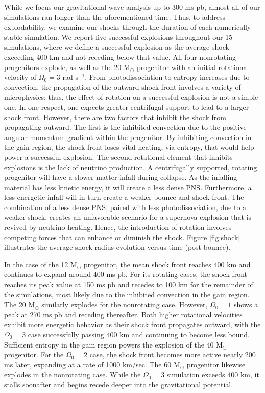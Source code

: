 \documentclass[twocolumn,times]{aastex62}  %
\newcommand{\Msun}{\ensuremath{\mathrm{M}_\odot}\xspace}
\begin{document}
While we focus our gravitational wave analysis up to 300 ms pb, almost all of our simulations ran longer than the aforementioned time.  Thus, to address explodability, we examine our shocks through the duration of each numerically stable simulation.  We report five successful explosions throughout our 15 simulations, where we define a successful explosion as the average shock exceeding 400 km and not receding below that value.  All four nonrotating progenitors explode, as well as the 20 \Msun progenitor with an initial rotational velocity of $\Omega_0 = 3$ rad s$^{-1}$.  From photodissociation to entropy increases due to convection, the propagation of the outward shock front involves a variety of microphysics; thus, the effect of rotation on a successful explosion is not a simple one.  In one respect, one expects greater centrifugal support to lead to a larger shock front.  However, there are two factors that inhibit the shock from propagating outward.  The first is the inhibited convection due to the positive angular momentum gradient within the progenitor.  By inhibiting convection in the gain region, the shock front loses vital heating, via entropy, that would help power a successful explosion.  The  second rotational element that inhibits explosions is the lack of neutrino production.  A centrifugally supported, rotating progenitor will have a slower matter infall during collapse.  As the infalling material has less kinetic energy, it will create a less dense PNS.  Furthermore, a less energetic infall will in turn create a weaker bounce and shock front.  The combination of a less dense PNS, paired with less photodissociation, due to a weaker shock, creates an unfavorable scenario for a supernova explosion that is revived by neutrino heating.  Hence, the introduction of rotation involves competing forces that can enhance or diminish the shock.  Figure \ref{fig:shock} illustrates the average shock radius evolution versus time (post bounce).

In the case of the 12 \Msun progenitor, the mean shock front reaches 400 km and continues to expand around 400 ms pb.  For its rotating cases, the shock front reaches its peak value at 150 ms pb and recedes to 100 km for the remainder of the simulations, most likely due to the inhibited convection in the gain region.  The 20 \Msun similarly explodes for the nonrotating case.  However, $\Omega_0 = 1$ shows a peak at 270 ms pb and receding thereafter.  Both higher rotational velocities exhibit more energetic behavior as their shock front propagates outward, with the $\Omega_0 = 3$ case successfully passing 400 km and continuing to become less bound.  Sufficient entropy in the gain region powers the explosion of the 40 \Msun progenitor.  For the $\Omega_0 = 2$ case, the shock front becomes more active nearly 200 ms later, expanding at a rate of 1000 km/sec.  The 60 \Msun progenitor likewise explodes in the nonrotating case.  While the $\Omega_0 = 3$ simulation exceeds 400 km, it stalls soonafter and begins recede deeper into the gravitational potential.  
\end{document}

